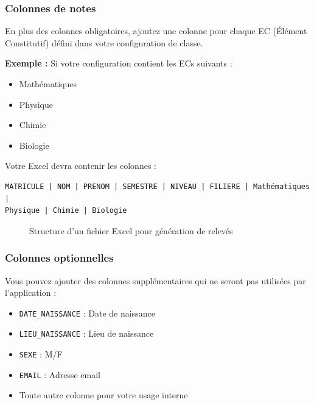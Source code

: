 \subsubsection{Colonnes de notes}

En plus des colonnes obligatoires, ajoutez une colonne pour chaque EC (Élément Constitutif) défini dans votre configuration de classe.

\textbf{Exemple :} Si votre configuration contient les ECs suivants :
\begin{itemize}
    \item Mathématiques
    \item Physique
    \item Chimie
    \item Biologie
\end{itemize}

Votre Excel devra contenir les colonnes :
\begin{verbatim}
MATRICULE | NOM | PRENOM | SEMESTRE | NIVEAU | FILIERE | Mathématiques |
Physique | Chimie | Biologie
\end{verbatim}

\begin{figure}[h]
    \centering
    \caption{Structure d'un fichier Excel pour génération de relevés}
\end{figure}

\subsubsection{Colonnes optionnelles}

Vous pouvez ajouter des colonnes supplémentaires qui ne seront pas utilisées par l'application :

\begin{itemize}[leftmargin=*]
    \item \texttt{DATE\_NAISSANCE} : Date de naissance
    \item \texttt{LIEU\_NAISSANCE} : Lieu de naissance
    \item \texttt{SEXE} : M/F
    \item \texttt{EMAIL} : Adresse email
    \item Toute autre colonne pour votre usage interne
\end{itemize}

